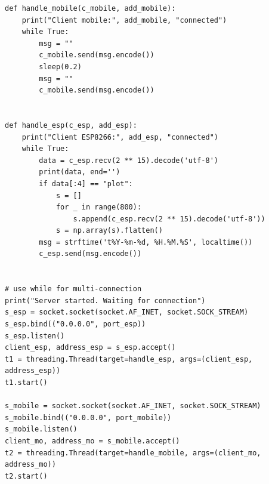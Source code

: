 \documentclass[a4paper]{article}
\begin{document}
\begin{lstlisting}
def handle_mobile(c_mobile, add_mobile):
    print("Client mobile:", add_mobile, "connected")
    while True:
        msg = ""
        c_mobile.send(msg.encode())
        sleep(0.2)
        msg = ""
        c_mobile.send(msg.encode())


def handle_esp(c_esp, add_esp):
    print("Client ESP8266:", add_esp, "connected")
    while True:
        data = c_esp.recv(2 ** 15).decode('utf-8')
        print(data, end='')
        if data[:4] == "plot":
            s = []
            for _ in range(800):
                s.append(c_esp.recv(2 ** 15).decode('utf-8'))
            s = np.array(s).flatten()
        msg = strftime('t%Y-%m-%d, %H.%M.%S', localtime())
        c_esp.send(msg.encode())


# use while for multi-connection
print("Server started. Waiting for connection")
s_esp = socket.socket(socket.AF_INET, socket.SOCK_STREAM)
s_esp.bind(("0.0.0.0", port_esp))
s_esp.listen()
client_esp, address_esp = s_esp.accept()
t1 = threading.Thread(target=handle_esp, args=(client_esp, address_esp))
t1.start()

s_mobile = socket.socket(socket.AF_INET, socket.SOCK_STREAM)
s_mobile.bind(("0.0.0.0", port_mobile))
s_mobile.listen()
client_mo, address_mo = s_mobile.accept()
t2 = threading.Thread(target=handle_mobile, args=(client_mo, address_mo))
t2.start()
\end{lstlisting}
\end{document}
